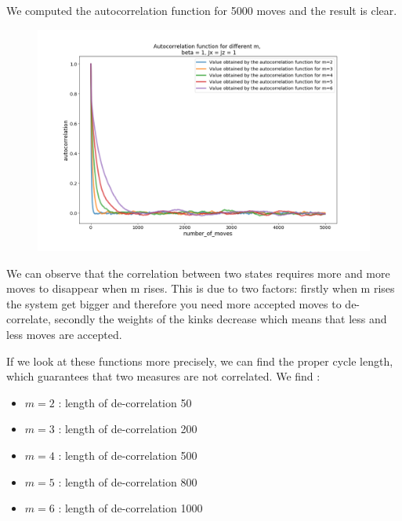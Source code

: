\documentclass[a4paper,12pt,twoside]{article}
\begin{document}
	We computed the autocorrelation function for 5000 moves and the result is clear.
	\begin{figure}[!h]
		\centering
		\includegraphics[scale=0.4]{autocorrelation_functionx=z=1_m2-6.png}
	\end{figure}

	We can observe that the correlation between two states requires more and more moves to disappear when m rises. This is due to two factors: firstly when m rises the system get bigger and therefore you need more accepted moves to de-correlate, secondly the weights of the kinks  decrease which means that less and less moves are accepted.

	If we look at these functions more precisely, we can find the proper cycle length, which guarantees that two measures are not correlated.
	We find :
	\begin{itemize}[label=$\star$]
		\item $m=2$ : length of de-correlation 50
		\item $m=3$ : length of de-correlation 200
		\item $m=4$ : length of de-correlation 500
		\item $m=5$ : length of de-correlation 800
		\item $m=6$ : length of de-correlation 1000
	\end{itemize}
\end{document}
